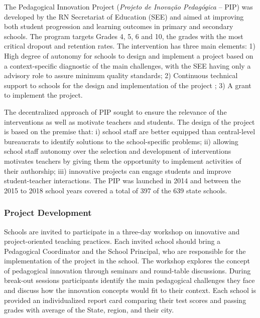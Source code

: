 \documentclass[11pt,a4paper]{article}
\begin{document}
The Pedagogical Innovation Project (\textit{Projeto de Inovação Pedagógica} -- PIP) was developed by the RN Secretariat of Education (SEE) and aimed at improving both student progression and learning outcomes in primary and secondary schools. The program targets Grades 4, 5, 6 and 10, the grades with the most critical dropout and retention rates. The intervention has three main elements: 1) High degree of autonomy for schools to design and implement a project based on a context-specific diagnostic of the main challenges, with the SEE having only a advisory role to assure minimum quality standards; 2) Continuous technical support to schools for the design and implementation of the project ; 3) A grant to implement the project. 

The decentralized approach of PIP sought to ensure the relevance of the interventions as well as motivate teachers and students. The design of the project is based on the premise that: i) school staff are better equipped than central-level bureaucrats to identify solutions to the school-specific problems; ii) allowing school staff autonomy over the selection and development of interventions motivates teachers by giving them the opportunity to implement activities of their authorship; iii) innovative projects can engage students and improve student-teacher interactions. The PIP was launched in 2014 and between the 2015 to 2018 school years covered a total of 397 of the 639 state schools.

\subsubsection*{Project Development} \label{sec:project}

Schools are invited to participate in a three-day workshop on innovative and project-oriented teaching practices. Each invited school should bring a Pedagogical Coordinator and the School Principal, who are responsible for the implementation of the project in the school. The workshop explores the concept of pedagogical innovation through seminars and round-table discussions. During break-out sessions participants identify the main pedagogical challenges they face and discuss how the innovation concepts would fit to their context. Each school is provided an individualized report card comparing their test scores and passing grades with average of the State, region, and their city.
\end{document}
